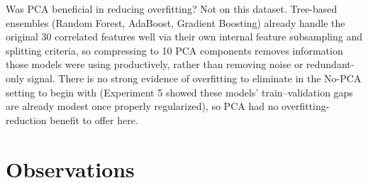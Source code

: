 \documentclass[12pt,a4paper]{article}
\DeclareRobustCommand{\_}{\textunderscore\allowbreak}
\begin{document}
\noindent Was PCA beneficial in reducing overfitting? Not on this dataset.
Tree-based ensembles (Random Forest, AdaBoost, Gradient Boosting) already
handle the original 30 correlated features well via their own internal
feature subsampling and splitting criteria, so compressing to 10 PCA
components removes information those models were using productively,
rather than removing noise or redundant-only signal. There is no strong
evidence of overfitting to eliminate in the No-PCA setting to begin with
(Experiment 5 showed these models' train--validation gaps are already
modest once properly regularized), so PCA had no overfitting-reduction
benefit to offer here.

\section{Observations}
\end{document}
